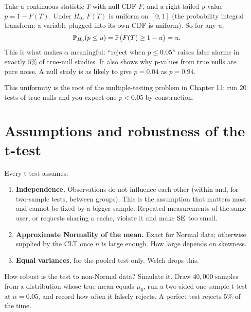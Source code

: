 \begin{whybox}
Take a continuous statistic $T$ with null CDF $F$, and a right-tailed p-value
$p = 1-F(T)$. Under $H_0$, $F(T)$ is uniform on $[0,1]$ (the probability integral
transform: a variable plugged into its own CDF is uniform). So for any $u$,
\[
  \P_{H_0}(p \le u) = \P\bigl(F(T)\ge 1-u\bigr) = u .
\]
This is what makes $\alpha$ meaningful: ``reject when $p\le 0.05$'' raises false
alarms in exactly $5\%$ of true-null studies. It also shows why p-values from true
nulls are pure noise. A null study is as likely to give $p=0.04$ as $p=0.94$.
\end{whybox}

This uniformity is the root of the multiple-testing problem in Chapter 11: run
$20$ tests of true nulls and you expect one $p<0.05$ by construction.

\section{Assumptions and robustness of the t-test}
\label{sec:ht-robust}

Every t-test assumes:
\begin{enumerate}
\item \textbf{Independence.} Observations do not influence each other (within and,
for two-sample tests, between groups). This is the assumption that matters most and
cannot be fixed by a bigger sample. Repeated measurements of the same user, or
requests sharing a cache, violate it and make $\SE$ too small.
\item \textbf{Approximate Normality of the mean.} Exact for Normal data; otherwise
supplied by the CLT once $n$ is large enough. How large depends on skewness.
\item \textbf{Equal variances}, for the pooled test only. Welch drops this.
\end{enumerate}

How robust is the test to non-Normal data? Simulate it. Draw $40{,}000$ samples
from a distribution whose true mean equals $\mu_0$, run a two-sided one-sample t-test
at $\alpha=0.05$, and record how often it falsely rejects. A perfect test rejects
$5\%$ of the time.

